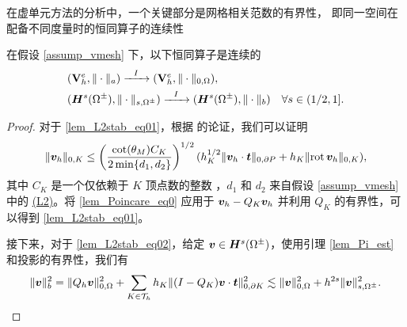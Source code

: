 在虚单元方法的分析中，一个关键部分是网格相关范数的有界性，
即同一空间在配备不同度量时的恒同算子的连续性
\begin{lemma}
\label{lem_L2stab}
在假设 \ref{assump_vmesh} 下，以下恒同算子是连续的
\begin{subequations}
\label{lem_L2stab_eq0}
\begin{align}
& (\mathbf{V}^e_h, \| \cdot \|_{a}) \xrightarrow[]{~~I~~}  (\mathbf{V}^e_h,\|\cdot\|_{0,\Omega}), \label{lem_L2stab_eq01} \\
&  ( \boldsymbol{H}^{s}(\Omega^{\pm}) ,\|\cdot\|_{s,\Omega^{\pm}} ) \xrightarrow[]{~~I~~}  ( \boldsymbol{H}^{s}(\Omega^{\pm}),\|\cdot\|_{b}) ~~~ \forall s\in(1/2,1]. \label{lem_L2stab_eq02}
\end{align}
\end{subequations}
\end{lemma}
\begin{proof}
对于 \eqref{lem_L2stab_eq01}，根据 \cite[引理 3.4]{2021CaoChenGuo} 的论证，我们可以证明
\begin{equation}
\label{lem_Poincare_eq0}
\| \boldsymbol{v}_h \|_{0,K} \le  \left( \frac{ \cot(\theta_{M}) C_K  }{2\min\{d_1,d_2\}} \right)^{1/2} (  h^{1/2}_{K} \|  \boldsymbol{v}_h\cdot\boldsymbol{t} \|_{0,\partial P} + h_{K} \| \mathrm{rot}\, \boldsymbol{v}_h \|_{0,K}),
\end{equation}
其中 $C_K$ 是一个仅依赖于 $K$ 顶点数的整数%
，$d_1$ 和 $d_2$ 来自假设 \ref{assump_vmesh} 中的 \hyperref[asp:polygonL2]{(L2)}。将 \eqref{lem_Poincare_eq0} 应用于 $\boldsymbol{v}_h - Q_K \boldsymbol{v}_h$ 并利用 $Q_K$ 的有界性，可以得到 \eqref{lem_L2stab_eq01}。

接下来，对于 \eqref{lem_L2stab_eq02}，给定 $\boldsymbol{v}\in \boldsymbol{H}^s(\Omega^{\pm})$，使用引理 \ref{lem_Pi_est} 和投影的有界性，我们有
\begin{equation}
\label{lem_L2stab_eq2}
\| \boldsymbol{v} \|^2_b = \| Q_h \boldsymbol{v} \|^2_{0,\Omega}  +  \sum_{K\in\mathcal{T}_h} h_K \| (I-Q_K )\boldsymbol{v}\cdot\boldsymbol{t} \|^2_{0,\partial K} \lesssim \| \boldsymbol{v} \|^2_{0,\Omega} + h^{2s} \| \boldsymbol{v} \|^2_{s,\Omega^{\pm}} .
\end{equation}
\end{proof}


